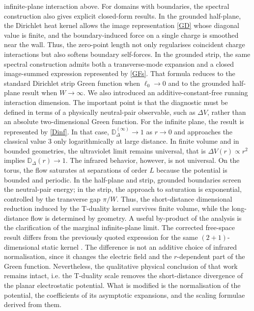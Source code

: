 \documentclass[nopacs,amsmath,amsfonts,amssymb,aps,superscriptaddress]{revtex4}
\begin{document}
infinite-plane interaction above. For domains with boundaries, the spectral construction also gives explicit closed-form results. In the grounded half-plane, the Dirichlet heat kernel allows the image representation \eqref{GD} whose diagonal value is finite, and the boundary-induced force on a single charge is smoothed near the wall. Thus, the zero-point length not only regularises coincident charge interactions but also softens boundary self-forces. In the grounded strip, the same spectral construction admits both a transverse-mode expansion and a closed image-summed expression represented by \eqref{GFs}. That formula reduces to the standard Dirichlet strip Green function when $\ell_0\to 0$ and to the grounded half-plane result when $W\to\infty$. We also introduced an additive-constant-free running interaction dimension. The important point is that the diagnostic must be defined in terms of a physically neutral-pair observable, such as $\Delta V$, rather than an absolute two-dimensional Green function. For the infinite plane, the result is represented by \eqref{Dinf}. In that case, $\mathbb D_\Delta^{(\infty)}\to 1$ as $r\to 0$ and approaches the classical value $3$ only logarithmically at large distance. In finite volume and in bounded geometries, the ultraviolet limit remains universal, that is $\Delta V(r)\propto r^2$ implies $\mathbb D_\Delta(r)\to 1$. The infrared behavior, however, is not universal. On the torus, the flow saturates at separations of order $L$ because the potential is bounded and periodic. In the half-plane and strip, grounded boundaries screen the neutral-pair energy; in the strip, the approach to saturation is exponential, controlled by the transverse gap $\pi/W$. Thus, the short-distance dimensional reduction induced by the T-duality kernel survives finite volume, while the long-distance flow is determined by geometry. A useful by-product of the analysis is the clarification of the marginal infinite-plane limit. The corrected free-space result differs from the previously quoted expression for the same $(2+1)$-dimensional static kernel \cite{GaeteNicolini2026}. The difference is not an additive choice of infrared normalisation, since it changes the electric field and the $r$-dependent part of the Green function. Nevertheless, the qualitative physical conclusion of that work remains intact, i.e. the T-duality scale removes the short-distance divergence of the planar electrostatic potential. What is modified is the normalisation of the potential, the coefficients of its asymptotic expansions, and the scaling formulae derived from them.
\end{document}

